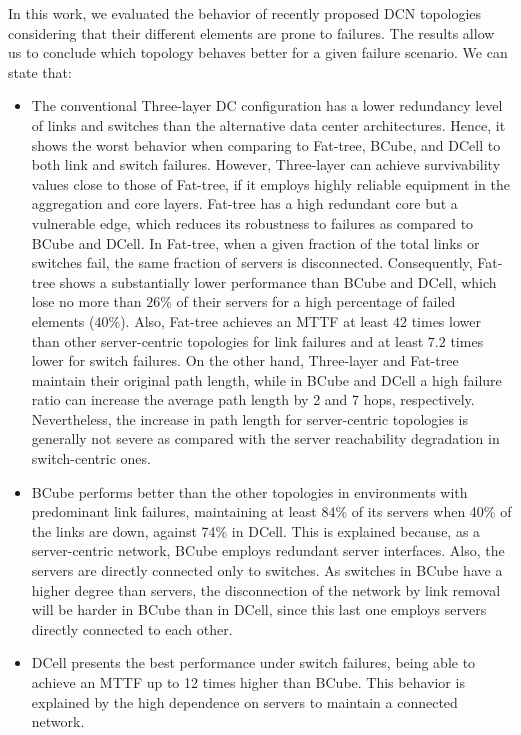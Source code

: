 In this work, we evaluated the behavior of recently proposed DCN topologies considering that their different elements are prone to failures. The results allow us to conclude which topology behaves better for a given failure scenario. We can state that:
\begin{itemize}
\item The conventional Three-layer DC configuration has a lower redundancy level of links and switches than the alternative data center architectures. Hence, it shows the worst behavior when comparing to Fat-tree, BCube, and DCell to both link and switch failures. However, Three-layer can achieve survivability values close to those of Fat-tree, if it employs highly reliable equipment in the aggregation and core layers.
Fat-tree has a high redundant core but a vulnerable edge, which reduces its robustness to failures as compared to BCube and DCell. In Fat-tree, when a given fraction of the total links or switches fail, the same fraction of servers is disconnected. Consequently, Fat-tree shows a substantially lower performance than BCube and DCell, which lose no more than $26\%$ of their servers for a high percentage of failed elements ($40\%$). Also, Fat-tree achieves an MTTF at least $42$ times lower than other server-centric topologies for link failures and at least $7.2$ times lower for switch failures. On the other hand, Three-layer and Fat-tree maintain their original path length, while in BCube and DCell a high failure ratio can increase the average path length by 2 and 7 hops, respectively. Nevertheless, the increase in path length for server-centric topologies is generally not severe as compared with the server reachability degradation in switch-centric ones.
\item BCube performs better than the other topologies in environments with predominant link failures, maintaining at least 84\% of its servers when 40\% of the links are down, against 74\% in DCell. This is explained because, as a server-centric network, BCube employs redundant server interfaces. Also, the servers are directly connected only to switches. As switches in BCube have a higher degree than servers, the disconnection of the network by link removal will be harder in BCube than in DCell, since this last one employs servers directly connected to each other.
\item DCell presents the best performance under switch failures, being able to achieve an MTTF up to 12 times higher than BCube. This behavior is explained by the high dependence on servers to maintain a connected network.
\end{itemize}
 
